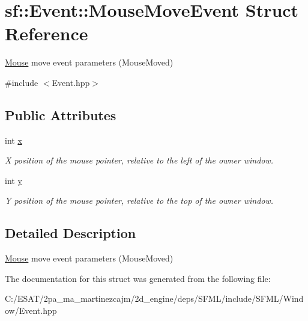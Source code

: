 \hypertarget{structsf_1_1_event_1_1_mouse_move_event}{}\section{sf\+:\+:Event\+:\+:Mouse\+Move\+Event Struct Reference}
\label{structsf_1_1_event_1_1_mouse_move_event}


\hyperlink{classsf_1_1_mouse}{Mouse} move event parameters (Mouse\+Moved)  




{\ttfamily \#include $<$Event.\+hpp$>$}

\subsection*{Public Attributes}
\begin{DoxyCompactItemize}
\item 
\mbox{\label{structsf_1_1_event_1_1_mouse_move_event_aa3a23809afb905cbb52c66d8512e21fd}} 
int \hyperlink{structsf_1_1_event_1_1_mouse_move_event_aa3a23809afb905cbb52c66d8512e21fd}{x}
\begin{DoxyCompactList}\small\item\em X position of the mouse pointer, relative to the left of the owner window. \end{DoxyCompactList}\item 
\mbox{\label{structsf_1_1_event_1_1_mouse_move_event_a86d78a2fba5b3abda16ca059f2392ad4}} 
int \hyperlink{structsf_1_1_event_1_1_mouse_move_event_a86d78a2fba5b3abda16ca059f2392ad4}{y}
\begin{DoxyCompactList}\small\item\em Y position of the mouse pointer, relative to the top of the owner window. \end{DoxyCompactList}\end{DoxyCompactItemize}


\subsection{Detailed Description}
\hyperlink{classsf_1_1_mouse}{Mouse} move event parameters (Mouse\+Moved) 

The documentation for this struct was generated from the following file\+:\begin{DoxyCompactItemize}
\item 
C\+:/\+E\+S\+A\+T/2pa\+\_\+ma\+\_\+martinezcajm/2d\+\_\+engine/deps/\+S\+F\+M\+L/include/\+S\+F\+M\+L/\+Window/Event.\+hpp\end{DoxyCompactItemize}
